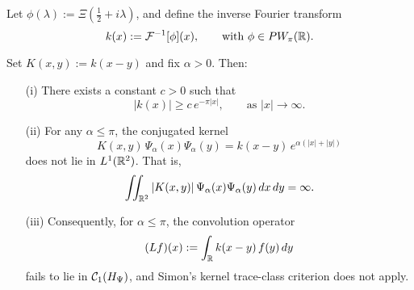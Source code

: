 \begin{lemma}
\label{lem:trace_class_failure_alpha_leq_pi}
Let \( \phi(\lambda) := \Xi\left( \tfrac{1}{2} + i\lambda \right) \), and define the inverse Fourier transform
\[
k(x) := \mathcal{F}^{-1}[\phi](x), \qquad \text{with } \phi \in PW_\pi(\mathbb{R}).
\]

Set \( K(x,y) := k(x - y) \) and fix \( \alpha > 0 \). Then:
\begin{itemize}
    \item[\textup{(i)}] There exists a constant \( c > 0 \) such that
    \[
    |k(x)| \ge c\, e^{-\pi |x|}, \qquad \text{as } |x| \to \infty.
    \]

    \item[\textup{(ii)}] For any \( \alpha \le \pi \), the conjugated kernel
    \[
    K(x,y)\, \Psi_\alpha(x)\Psi_\alpha(y) = k(x - y)\, e^{\alpha(|x| + |y|)}
    \]
    does not lie in \( L^1(\mathbb{R}^2) \). That is,
    \[
    \iint_{\mathbb{R}^2} |K(x,y)|\, \Psi_\alpha(x)\Psi_\alpha(y)\, dx\,dy = \infty.
    \]

    \item[\textup{(iii)}] Consequently, for \( \alpha \le \pi \), the convolution operator
    \[
    (Lf)(x) := \int_{\mathbb{R}} k(x - y)\, f(y)\, dy
    \]
    fails to lie in \( \mathcal{C}_1(H_{\Psi}) \), and Simon’s kernel trace-class criterion does not apply.
\end{itemize}
\end{lemma}
